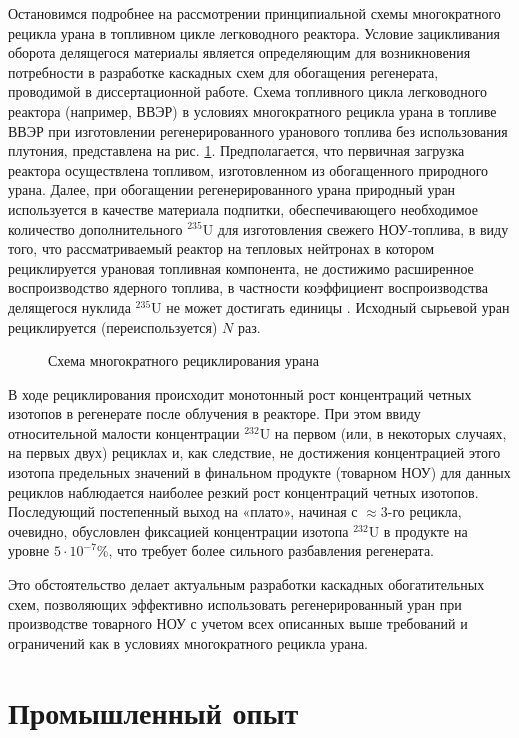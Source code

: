 Остановимся подробнее на рассмотрении принципиальной схемы многократного рецикла урана в топливном цикле легководного реактора. Условие зацикливания оборота делящегося материалы является определяющим для возникновения потребности в разработке каскадных схем для обогащения регенерата, проводимой в диссертационной работе. Схема топливного цикла легководного реактора (например, ВВЭР) в условиях многократного рецикла урана в топливе ВВЭР при изготовлении регенерированного уранового топлива без использования плутония, представлена на рис. \ref{recycle}. Предполагается, что первичная загрузка реактора осуществлена топливом, изготовленном из обогащенного природного урана. Далее, при обогащении регенерированного урана природный уран используется в качестве материала подпитки, обеспечивающего необходимое количество дополнительного $^{235}$U для изготовления свежего НОУ-топлива, в виду того, что рассматриваемый реактор на тепловых нейтронах в котором рециклируется урановая топливная компонента, не достижимо расширенное воспроизводство ядерного топлива, в частности коэффициент воспроизводства делящегося нуклида $^{235}$U не может достигать единицы \cite{ignatevVliyanieVidaTopliva2020}. Исходный сырьевой уран рециклируется (переиспользуется) $N$ раз.

\begin{figure}[ht]
  \caption{Схема многократного рециклирования урана}\label{recycle}
\end{figure}

В ходе рециклирования происходит монотонный рост концентраций четных изотопов в регенерате после облучения в реакторе. При этом ввиду относительной малости концентрации $^{232}$U на первом (или, в некоторых случаях, на первых двух) рециклах и, как следствие, не достижения концентрацией этого изотопа предельных значений в финальном продукте (товарном НОУ) для данных рециклов наблюдается наиболее резкий рост концентраций четных изотопов. Последующий постепенный выход на «плато», начиная с $\approx$3-го рецикла, очевидно, обусловлен фиксацией концентрации изотопа $^{232}$U в продукте на уровне $5\cdot10^{-7}$\%, что требует более сильного разбавления регенерата.

Это обстоятельство делает актуальным разработки каскадных обогатительных схем, позволяющих эффективно использовать регенерированный уран при производстве товарного НОУ с учетом всех описанных выше требований и ограничений как в условиях многократного рецикла урана.

\section{Промышленный опыт}\label{sec:ch1/sec1}

